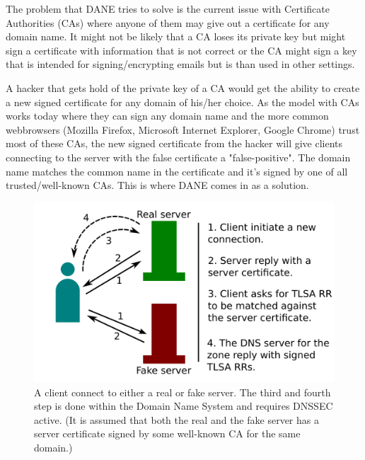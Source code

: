 The problem that DANE tries to solve is the current issue with Certificate Authorities (CAs) where anyone of them may give out a certificate for any domain name.
It might not be likely that a CA loses its private key but might sign a certificate with information that is not correct or the CA might sign a key that is intended for signing/encrypting emails but is than used in other settings.

A hacker that gets hold of the private key of a CA would get the ability to create a new signed certificate for any domain of his/her choice.
As the model with CAs works today where they can sign any domain name and the more common webbrowsers (Mozilla Firefox, Microsoft Internet Explorer, Google Chrome) trust most of these CAs, the new signed certificate from the hacker will give clients connecting to the server with the false certificate a "false-positive".
The domain name matches the common name in the certificate and it's signed by one of all trusted/well-known CAs.
This is where DANE comes in as a solution.

\begin{figure}[ht]
\begin{center}
\includegraphics[scale=1]{Figures/daneWithTlsa.png}
\end{center}
\caption{A client connect to either a real or fake server. The third and fourth step is done within the Domain Name System and requires DNSSEC active. (It is assumed that both the real and the fake server has a server certificate signed by some well-known CA for the same domain.)\label{ch3:daneWithTlsa}}
\end{figure}

